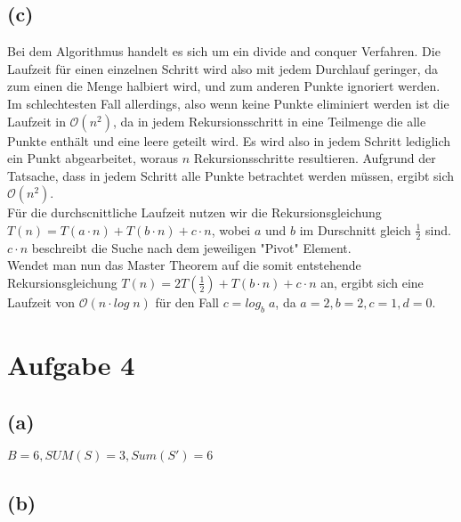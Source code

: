 \documentclass[a4paper]{scrartcl}
\begin{document}
\subsection*{(c)}
Bei dem Algorithmus handelt es sich um ein divide and conquer Verfahren. Die Laufzeit für einen einzelnen Schritt wird also mit jedem Durchlauf geringer, da zum einen die Menge halbiert wird, und zum anderen Punkte ignoriert werden.\\
Im schlechtesten Fall allerdings, also wenn keine Punkte eliminiert werden ist die Laufzeit in $\mathcal{O}(n^2)$, da in jedem Rekursionsschritt in eine Teilmenge die alle Punkte enthält und eine leere geteilt wird.
Es wird also in jedem Schritt lediglich ein Punkt abgearbeitet, woraus $n$ Rekursionsschritte resultieren. Aufgrund der Tatsache, dass in jedem Schritt alle Punkte betrachtet werden müssen, ergibt sich $\mathcal{O}(n^2)$.\\
Für die durchscnittliche Laufzeit nutzen wir die Rekursionsgleichung $T(n) = T(a \cdot n) + T(b \cdot n) + c \cdot n$, wobei $a$ und $b$ im Durschnitt gleich $\frac{1}{2}$ sind. $c \cdot n$ beschreibt die Suche nach dem jeweiligen "Pivot" Element. \\
Wendet man nun das Master Theorem auf die somit entstehende  Rekursionsgleichung $T(n) = 2T(\frac{1}{2}) + T(b \cdot n) + c \cdot n$ an, ergibt sich eine Laufzeit von $\mathcal{O}(n \cdot log\;n)$ für den Fall $c = log_b\;a$, da $a = 2, b=2, c = 1, d = 0$.





\section*{Aufgabe 4}
\subsection*{(a)}
$
B = 6,
SUM(S) = 3, 
Sum(S') = 6
$


\subsection*{(b)}
\end{document}

